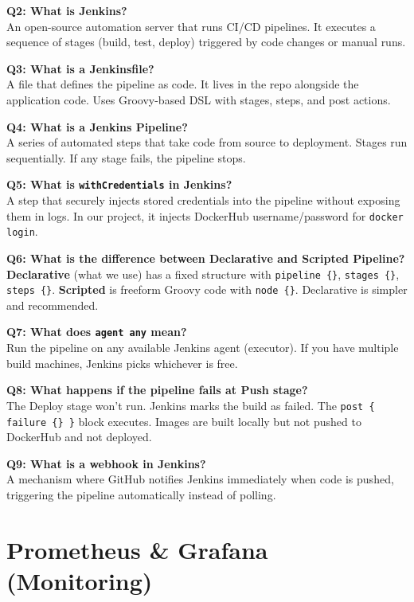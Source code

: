 \documentclass[12pt,a4paper]{article}
\begin{document}
\textbf{Q2: What is Jenkins?}\\
An open-source automation server that runs CI/CD pipelines. It executes a sequence of stages (build, test, deploy) triggered by code changes or manual runs.

\textbf{Q3: What is a Jenkinsfile?}\\
A file that defines the pipeline as code. It lives in the repo alongside the application code. Uses Groovy-based DSL with stages, steps, and post actions.

\textbf{Q4: What is a Jenkins Pipeline?}\\
A series of automated steps that take code from source to deployment. Stages run sequentially. If any stage fails, the pipeline stops.

\textbf{Q5: What is \texttt{withCredentials} in Jenkins?}\\
A step that securely injects stored credentials into the pipeline without exposing them in logs. In our project, it injects DockerHub username/password for \texttt{docker login}.

\textbf{Q6: What is the difference between Declarative and Scripted Pipeline?}\\
\textbf{Declarative} (what we use) has a fixed structure with \texttt{pipeline \{\}}, \texttt{stages \{\}}, \texttt{steps \{\}}. \textbf{Scripted} is freeform Groovy code with \texttt{node \{\}}. Declarative is simpler and recommended.

\textbf{Q7: What does \texttt{agent any} mean?}\\
Run the pipeline on any available Jenkins agent (executor). If you have multiple build machines, Jenkins picks whichever is free.

\textbf{Q8: What happens if the pipeline fails at Push stage?}\\
The Deploy stage won't run. Jenkins marks the build as failed. The \texttt{post \{ failure \{\} \}} block executes. Images are built locally but not pushed to DockerHub and not deployed.

\textbf{Q9: What is a webhook in Jenkins?}\\
A mechanism where GitHub notifies Jenkins immediately when code is pushed, triggering the pipeline automatically instead of polling.

\section{Prometheus \& Grafana (Monitoring)}
\end{document}

